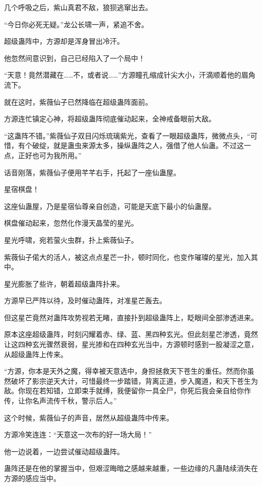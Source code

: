 \begin{this_body}
几个呼吸之后，紫山真君不敌，狼狈逃窜出去。

“今日你必死无疑。”龙公长啸一声，紧追不舍。

超级蛊阵中，方源却是浑身冒出冷汗。

他忽然间意识到，自己已经陷入了一个局中！

“天意！竟然潜藏在……不，或者说……”方源瞳孔缩成针尖大小，汗滴顺着他的眉角流下。

就在这时，紫薇仙子已然降临在超级蛊阵面前。

方源连忙镇定心神，将超级蛊阵彻底催动起来，全神戒备眼前大敌。

“这蛊阵不错。”紫薇仙子双目闪烁琉璃紫光，查看了一眼超级蛊阵，微微点头，“可惜，有个破绽，就是蛊虫来源太多，操纵蛊阵之人，强借了他人仙蛊。不过这一点，正好也可为我所用。”

话音刚落，紫薇仙子便用芊芊右手，托起了一座仙蛊屋。

星宿棋盘！

这座仙蛊屋，乃是星宿仙尊亲自创造，可能是天底下最小的仙蛊屋。

棋盘催动起来，忽然化作漫天晶莹的星光。

星光呼啸，宛若萤火虫群，扑上紫薇仙子。

紫薇仙子偌大的活人，被这点点星芒一扑，顿时同化，也变作璀璨的星光，加入其中。

星光膨胀了些许，朝着超级蛊阵扑来。

方源早已严阵以待，及时催动蛊阵，对准星芒轰去。

但这星芒竟然对蛊阵攻势视若无睹，直接扑到超级蛊阵上，眨眼间全部渗透进来。

原本这座超级蛊阵，时刻闪耀着赤、绿、蓝、黑四种玄光。但此刻星芒渗透，竟然让这四种玄光骤然衰弱，星光掺和在四种玄光当中，方源顿时感到一股凝涩之意，从超级蛊阵上传来。

“方源，你本是天外之魔，得幸被天意选中，身担拯救天下苍生的重任。然而你虽然破坏了影宗逆天大计，可惜最终一步踏错，背离正道，步入魔道，和天下苍生为敌。你现在若知错，立即束手就缚，我便留你一具全尸，你死后我会亲自给你作传，让你名声流传千秋，警示后人。”

这个时候，紫薇仙子的声音，居然从超级蛊阵中传来。

方源冷笑连连：“天意这一次布的好一场大局！”

他一边说着，一边尝试催动超级蛊阵。

蛊阵还是在他的掌握当中，但艰涩晦暗之感越来越重，一些边缘的凡蛊陆续消失在方源的感应当中。


\end{this_body}
